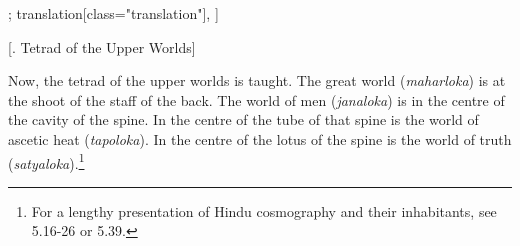 \begin{alignment}[
  texts=edition[class="edition"];
  translation[class="translation"],
  ]
\begin{translation}
\begin{tlate}
\vfill
\smallskip
 \centerline{\textrm{\small{[. Tetrad of the Upper Worlds]}}}
\bigskip
Now, the tetrad of the upper worlds is taught. The great world (\textit{maharloka}) is at the shoot of the staff of the back. The world of men (\textit{janaloka}) is in the centre of the cavity of the spine. In the centre of the tube of that spine is the world of ascetic heat (\textit{tapoloka}). In the centre of the lotus of the spine is the world of truth (\textit{satyaloka}).\footnote{For a lengthy presentation of Hindu cosmography and their inhabitants, see  5.16-26 or  5.39.}
    \end{tlate}
  \end{translation}
\end{alignment}
\pagebreak %
